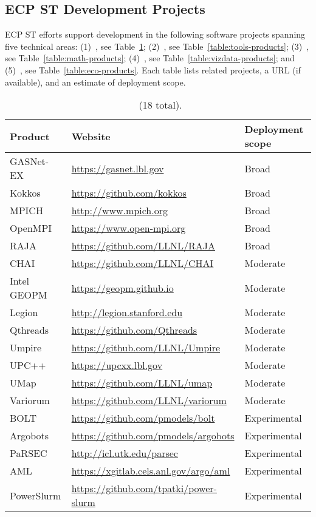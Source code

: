 \subsection{ECP ST Development Projects}\label{subsect:projects}
 ECP ST efforts support development in the following software projects spanning five technical areas: %
 (1)~\pmr, see Table~\ref{table:pmr-products};
 (2)~\tools, see Table~\ref{table:tools-products};
 (3)~\mathlibs, see Table~\ref{table:math-products};
 (4)~\dataviz, see Table~\ref{table:vizdata-products}; and
 (5)~\ecosystem, see Table~\ref{table:eco-products}.
 Each table lists related projects, a URL (if available), and an estimate of deployment scope.

\begin{table}[H]
	\begin{tabularx}{\textwidth}{|l|X|l|}\hline
		\rowcolor{LightCyan}
		\textbf{Product} & \textbf{Website} & \textbf{Deployment scope}\\\hline
		GASNet-EX & \url{https://gasnet.lbl.gov} & Broad\\\hline
		Kokkos & \url{https://github.com/kokkos} & Broad\\\hline
		MPICH & \url{http://www.mpich.org} & Broad\\\hline
		OpenMPI & \url{https://www.open-mpi.org} & Broad\\\hline
		RAJA & \url{https://github.com/LLNL/RAJA} & Broad\\\hline

		CHAI & \url{https://github.com/LLNL/CHAI} & Moderate\\\hline
		Intel GEOPM & \url{https://geopm.github.io} & Moderate\\\hline
		Legion & \url{http://legion.stanford.edu} & Moderate\\\hline
		Qthreads & \url{https://github.com/Qthreads} & Moderate\\\hline
		Umpire & \url{https://github.com/LLNL/Umpire} & Moderate\\\hline
		UPC++ & \url{https://upcxx.lbl.gov} & Moderate\\\hline
		UMap & \url{https://github.com/LLNL/umap} & Moderate\\\hline
		Variorum & \url{https://github.com/LLNL/variorum} & Moderate\\\hline

		BOLT & \url{https://github.com/pmodels/bolt} & Experimental\\\hline
		Argobots & \url{https://github.com/pmodels/argobots} & Experimental\\\hline
		PaRSEC & \url{http://icl.utk.edu/parsec} & Experimental\\\hline
		AML & \url{https://xgitlab.cels.anl.gov/argo/aml} & Experimental\\\hline
		PowerSlurm & \url{https://github.com/tpatki/power-slurm} & Experimental\\\hline
	\end{tabularx}
\caption{\label{table:pmr-products} \pmr~(18 total).}
\end{table}

